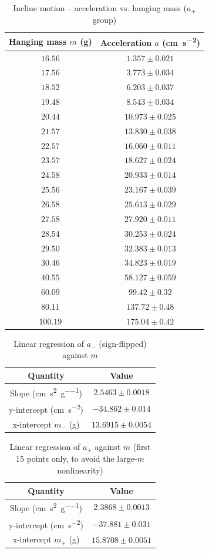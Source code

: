 \begin{table}[htb!]
\centering
\caption{Incline motion -- acceleration vs. hanging mass ($a_{+}$ group)}
\begin{tabular}{cc}
\toprule
Hanging mass $m$ (\unit{\g}) & Acceleration $a$ (\unit{\cm\per\s\squared}) \\
\midrule
$16.56$ & $1.357 \pm 0.021$ \\
$17.56$ & $3.773 \pm 0.034$ \\
$18.52$ & $6.203 \pm 0.037$ \\
$19.48$ & $8.543 \pm 0.034$ \\
$20.44$ & $10.973 \pm 0.025$ \\
$21.57$ & $13.830 \pm 0.038$ \\
$22.57$ & $16.060 \pm 0.011$ \\
$23.57$ & $18.627 \pm 0.024$ \\
$24.58$ & $20.933 \pm 0.014$ \\
$25.56$ & $23.167 \pm 0.039$ \\
$26.58$ & $25.613 \pm 0.029$ \\
$27.58$ & $27.920 \pm 0.011$ \\
$28.54$ & $30.253 \pm 0.024$ \\
$29.50$ & $32.383 \pm 0.013$ \\
$30.46$ & $34.823 \pm 0.019$ \\
$40.55$ & $58.127 \pm 0.059$ \\
$60.09$ & $99.42 \pm 0.32$ \\
$80.11$ & $137.72 \pm 0.48$ \\
$100.19$ & $175.04 \pm 0.42$ \\
\bottomrule
\end{tabular}
\end{table}
\begin{table}[htb!]
\centering
\caption{Linear regression of $a_{-}$ (sign-flipped) against $m$}
\begin{tabular}{cc}
\toprule
Quantity & Value \\
\midrule
Slope (\unit{\cm\per\s\squared\per\g}) & $2.5463 \pm 0.0018$ \\
y-intercept (\unit{\cm\per\s\squared}) & $-34.862 \pm 0.014$ \\
x-intercept $m_{-}$ (\unit{\g}) & $13.6915 \pm 0.0054$ \\
\bottomrule
\end{tabular}
\end{table}
\begin{table}[htb!]
\centering
\caption{Linear regression of $a_{+}$ against $m$ (first 15 points only, to avoid the large-$m$ nonlinearity)}
\begin{tabular}{cc}
\toprule
Quantity & Value \\
\midrule
Slope (\unit{\cm\per\s\squared\per\g}) & $2.3868 \pm 0.0013$ \\
y-intercept (\unit{\cm\per\s\squared}) & $-37.881 \pm 0.031$ \\
x-intercept $m_{+}$ (\unit{\g}) & $15.8708 \pm 0.0051$ \\
\bottomrule
\end{tabular}
\end{table}
